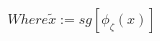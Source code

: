 \documentclass[preview]{standalone}
\begin{document}
\begin{align*}
Where  \tilde x := sg[\phi_\zeta (x)]
\end{align*}
\end{document}
